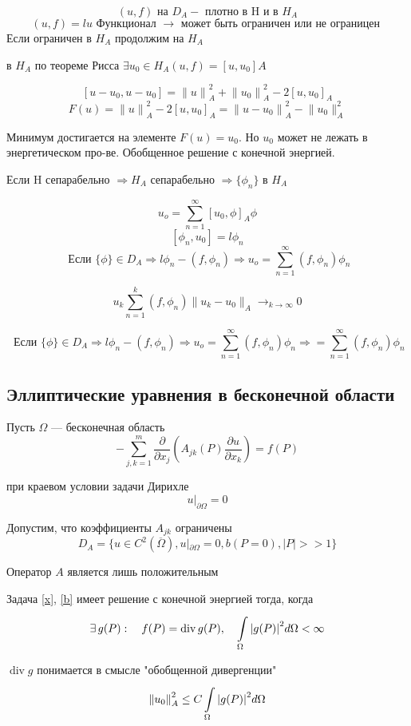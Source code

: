 \[ (u, f) \textrm{ на  } D_A - \textrm{ плотно в H и в } H_A  \]
\[ (u,f) = lu \textrm{ Функционал } \rightarrow \textrm{ может быть ограничен или не ограницен } \]
Если ограничен в $H_A$ продолжим на $H_A$

в $ H_A $ по теореме Рисса $ \exists u_0 \in H_A (u, f) = [u, u_0]A $

\[ [u - u_0, u-u_0] = {\|u\|}^2_A + {\|u_0\|}^2_A - 2{[u, u_0]}_A \]
\[ F(u) = {\| u \|}^2_A - 2[u, u_0]_A = {\|u-u_0\|}^2_A - {\|u_0\|^2_A} \label{8_2_4} \]

Минимум достигается на элементе $F(u) = u_0$. Но $ u_0 $ может не лежать в энергетическом про-ве. Обобщенное решение с конечной энергией.

Если H сепарабельно $ \Rightarrow H_A $ сепарабельно $ \Rightarrow \{ \phi_n \} $ в $ H_A $

\[ u_o = \sum_{n=1}^{\infty}{[u_0, \phi]}_A \phi\]
\[ [\phi_n, u_0] = l\phi_n \]
\[\textrm{ Если } \{\phi \} \in D_A \Rightarrow l \phi_n - (f, \phi_n) \Rightarrow u_o = \sum_{n=1}^{\infty} (f, \phi_n) \phi_n  \]

\[ u_k \sum_{n=1}^{k} (f, \phi_n) \|u_k - u_0\|_{A} \rightarrow_{k \rightarrow \infty} 0 \]

\[\textrm{ Если } \{\phi \} \in D_A \Rightarrow l \phi_n - (f, \phi_n) \Rightarrow u_o = \sum_{n=1}^{\infty} (f, \phi_n) \phi_n \Rightarrow = \sum_{n=1}^{\infty} (f, \phi_n) \phi_n \]

\subsection{Эллиптические уравнения в бесконечной области}

Пусть $\Omega$ --- бесконечная область
\[ -\sum_{j,k=1}^{m} \frac{\partial }{\partial x_j} \left(A_{jk} (P)\frac{\partial u}{\partial x_k}\right) = f(P) \]

при краевом условии задачи Дирихле
\[ u|_{\partial \Omega} = 0\]

Допустим, что коэффициенты $A_{jk}$ ограничены
\[ D_A = \{u \in C^2(\overline{\Omega}), u|_{\partial \Omega} = 0, b(P = 0), |P| >> 1 \} \]

Оператор $A$ является лишь положительным

Задача \eqref{x}, \eqref{b} имеет решение с конечной энергией тогда, когда
\[ \exists \, g(P): \quad f(P) = \operatorname{div} g(P), \quad\int\limits_{\Omega}^{} {|g(P)|}^2 d\Omega < \infty \]

$\operatorname{div} g$ понимается в смысле "обобщенной дивергенции"
\[ {\|u_0\|}^2_A \leq C \int\limits_{\Omega}^{} {| g(P) |}^2 d \Omega \]

